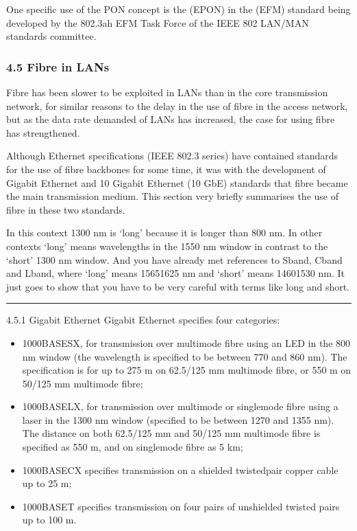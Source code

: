 \documentclass[letterpaper,10pt,english]{sphinxmanual}
\begin{document}
One specific use of the PON concept is the  (EPON) in the  (EFM) standard being developed by the 802.3ah EFM Task Force of the IEEE 802 LAN/MAN standards committee.


\subsubsection{4.5 Fibre in LANs}
\label{\detokenize{content/session_00/Part_00_04:4.5-Fibre-in-LANs}}
Fibre has been slower to be exploited in LANs than in the core transmission network, for similar reasons to the delay in the use of fibre in the access network, but as the data rate demanded of LANs has increased, the case for using fibre has strengthened.

Although Ethernet specifications (IEEE 802.3 series) have contained standards for the use of fibre backbones for some time, it was with the development of Gigabit Ethernet and 10 Gigabit Ethernet (10 GbE) standards that fibre became the main transmission medium. This section very briefly summarises the use of fibre in these two standards.

In this context 1300 nm is ‘long’ \textendash{} because it is longer than 800 nm. In other contexts ‘long’ means wavelengths in the 1550 nm window in contrast to the ‘short’ 1300 nm window. And you have already met references to S\sphinxhyphen{}band, C\sphinxhyphen{}band and L\sphinxhyphen{}band, where ‘long’ means 1565\textendash{}1625 nm and ‘short’ means 1460\textendash{}1530 nm. It just goes to show that you have to be very careful with terms like long and short.


\bigskip\hrule\bigskip


4.5.1 Gigabit Ethernet Gigabit Ethernet specifies four categories:
\begin{itemize}
\item {} 
1000BASE\sphinxhyphen{}SX, for transmission over multimode fibre using an LED in the 800 nm window (the wavelength is specified to be between 770 and 860 nm). The specification is for up to 275 m on 62.5/125 mm multimode fibre, or 550 m on 50/125 mm multimode fibre;

\item {} 
1000BASE\sphinxhyphen{}LX, for transmission over multimode or single\sphinxhyphen{}mode fibre using a laser in the 1300 nm window (specified to be between 1270 and 1355 nm). The distance on both 62.5/125 mm and 50/125 mm multimode fibre is specified as 550 m, and on single\sphinxhyphen{}mode fibre as 5 km;

\item {} 
1000BASE\sphinxhyphen{}CX specifies transmission on a shielded twisted\sphinxhyphen{}pair copper cable up to 25 m;

\item {} 
1000BASE\sphinxhyphen{}T specifies transmission on four pairs of unshielded twisted pairs up to 100 m.

\end{itemize}
\end{document}
